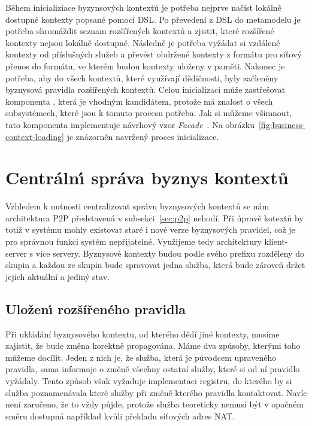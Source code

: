 Během inicializiace byzynsových kontextů je potřeba nejprve načíst lokálně dostupné kontexty popsané pomocí \gls{DSL}.
Po převedení z \gls{DSL} do metamodelu je potřeba shromáždit seznam rozšířených kontextů a zjistit, které
rozšířené kontexty nejsou lokálně dostupné. Následně je potřeba vyžádat si vzdálené kontexty od příslušných služeb
a převést obdržené kontexty z formátu pro síťový přenos do formátu, ve kterém budou kontexty uloženy v paměti.
Nakonec je potřeba, aby do všech kontextů, které využívají dědičnosti, byly začleněny byznysová pravidla
rozšířených kontextů. Celou inicializaci může zastřešovat komponenta , která
je vhodným kandidátem, protože má znalost o všech subsystémech, které jsou k tomuto procesu potřeba.
Jak si můžeme všimnout, tato komponenta implementuje návrhový vzor \textit{Facade}~\cite{fowler2002patterns}.
Na obrázku~\ref{fig:business-context-loading} je znázorněn navržený proces inicializace.

\section{Centráln\'{\i} správa byznys kontextů}

Vzhledem k nutnosti centralizovat správu byznysových kontextů se nám
architektura \gls{P2P} představená v subsekci~\ref{sec:p2p} nehodí.
Při úpravě kotextů by totiž v systému mohly existovat staré i nové verze
byznysových pravidel, což je pro správnou funkci systém nepřijatelné.
Využijeme tedy architektury klient-server s více servery.
Byznysové kontexty budou podle svého prefixu rozděleny do skupin
a každou ze skupin bude spravovat jedna služba, která bude zároveň
držet jejich aktuální a jediný stav.

\subsection{Uložen\'{\i} rozšířeného pravidla}\label{sec:saving-context}

Při ukládání byznysového kontextu, od kterého dědí jiné kontexty, musíme zajistit, že
bude změna korektně propagována. Máme dva způsoby, kterými toho můžeme docílit. Jeden z nich je,
že služba, která je původcem upraveného pravidla, sama informuje o změně všechny ostatní služby,
které si od ní pravidlo vyžádaly. Tento způsob však vyžaduje implementaci registru, do kterého by
si služba poznamenávala které služby při změně kterého pravidla kontaktovat. Navíc není zaručeno,
že to vždy půjde, protože služba teoreticky nemusí být v opačném směru dostupná \textendash\xspace například
kvůli překladu síťových adres \gls{NAT}.

